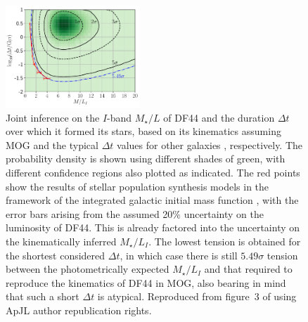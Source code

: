 \documentclass[fleqn,usenatbib,useAMS]{mnras} %
\begin{document}
\begin{figure}
	\centering
	\includegraphics[width=0.45\textwidth]{Haghi_2019_DF44_Figure_3_MOG}
	\caption{Joint inference on the $I$-band $M_{\star}/L$ of DF44 and the duration $\Delta t$ over which it formed its stars, based on its kinematics \citep{Van_Dokkum_2019} assuming MOG and the typical $\Delta t$ values for other galaxies \citep{Jan_2009}, respectively. The probability density is shown using different shades of green, with different confidence regions also plotted as indicated. The red points show the results of stellar population synthesis models in the framework of the integrated galactic initial mass function \citep{Kroupa_2003}, with the error bars arising from the assumed 20\% uncertainty on the luminosity of DF44. This is already factored into the uncertainty on the kinematically inferred $M_{\star}/L_I$. The lowest tension is obtained for the shortest considered $\Delta t$, in which case there is still $5.49\sigma$ tension between the photometrically expected $M_{\star}/L_I$ and that required to reproduce the kinematics of DF44 in MOG, also bearing in mind that such a short $\Delta t$ is atypical. Reproduced from figure~3 of \citet{Haghi_2019_DF44} using ApJL author republication rights.}
	\label{Haghi_2019_DF44_Figure_3_MOG}
\end{figure}
\end{document}
